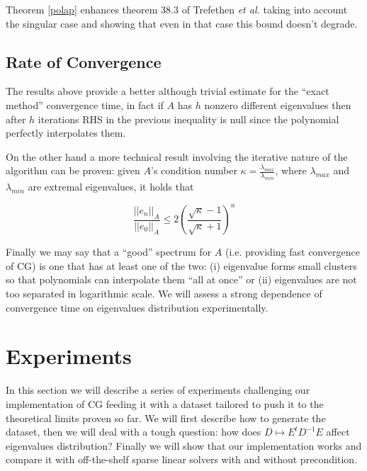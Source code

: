 \documentclass[12pt]{article}
\newcommand{\1}{\mathbbm{1}}
\begin{document}
 Theorem \ref{polap} enhances theorem 38.3 of Trefethen {\em et al.} \cite{trefethen97} taking into account the singular case and showing that even in that case this bound doesn't degrade.

\subsection{Rate of Convergence}
The results above provide a better although trivial estimate for the ``exact method'' convergence time, in fact if $A$ has $h$ nonzero different eigenvalues then after $h$ iterations RHS in the previous inequality is null since the polynomial perfectly interpolates them.

On the other hand a more technical result involving the iterative nature of the algorithm can be proven: given $A$'s condition number $\kappa = \frac{\lambda_{max}}{\lambda_{min}}$, where $\lambda_{max}$ and $\lambda_{min}$ are extremal eigenvalues, it holds that

$$ \frac{||e_n||_A}{||e_0||_A} \leq 2 \left(\frac{\sqrt{\kappa} - 1}{\sqrt{\kappa} + 1}\right)^n $$

Finally we may say that a ``good'' spectrum for $A$ (i.e. providing fast convergence of CG) is one that has at least one of the two: (i) eigenvalue forms small clusters so that polynomials can interpolate them ``all at once'' or (ii) eigenvalues are not too separated in logarithmic scale. We will assess a strong dependence of convergence time on eigenvalues distribution experimentally. 


\section{Experiments}
In this section we will describe a series of experiments challenging our implementation of CG feeding it with a dataset tailored to push it to the theoretical limits proven so far. We will first describe how to generate the dataset, then we will deal with a tough question: how does $D \mapsto E^t D^{-1} E$ affect eigenvalues distribution? Finally we will show that our implementation works and compare it with off-the-shelf sparse linear solvers with and without precondition.
\end{document}
